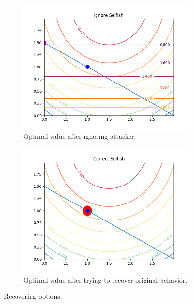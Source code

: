 \documentclass[../main.tex]{subfiles}
\begin{document}
\begin{figure}[h]
  \centering
  \begin{subfigure}{0.45\textwidth}
    \includegraphics[width=\textwidth]{../img/ignoreX.png}
    \caption{Optimal value after ignoring attacker.}
    \label{fig:third}
  \end{subfigure}
  \hfill
  \begin{subfigure}{0.45\textwidth}
    \includegraphics[width=\textwidth]{../img/correctX.png}
    \caption{Optimal value after trying to recover original behavior.}
    \label{fig:third}
  \end{subfigure}

  \caption{Recovering options.}
  \label{fig:figures}
\end{figure}
\end{document}
